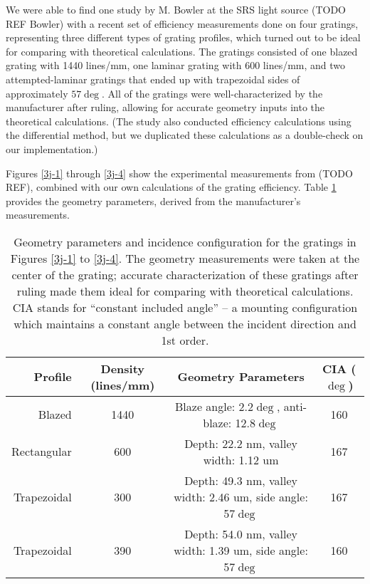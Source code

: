  We were able to find one study by M. Bowler at the SRS light source (TODO REF Bowler) with a recent set of efficiency measurements done on four gratings, representing three different types of grating profiles, which turned out to be ideal for comparing with theoretical calculations.  The gratings consisted of one blazed grating with 1440 lines/mm, one laminar grating with 600 lines/mm, and two attempted-laminar gratings that ended up with trapezoidal sides of approximately $57\deg$.  All of the gratings were well-characterized by the manufacturer after ruling, allowing for accurate geometry inputs into the theoretical calculations.  (The study also conducted efficiency calculations  using the differential method, but we duplicated these calculations as a double-check on our implementation.)

Figures \ref{3j-1} through \ref{3j-4} show the experimental measurements from (TODO REF), combined with our own calculations of the grating efficiency.  Table \ref{3j-table} provides the geometry parameters, derived from the manufacturer's measurements.

\begin{table}[htbp]
   \centering
   \caption{Geometry parameters and incidence configuration for the gratings in Figures \ref{3j-1} to \ref{3j-4}.  The geometry measurements were taken at the center of the grating; accurate characterization of these gratings after ruling made them ideal for comparing with theoretical calculations. CIA stands for ``constant included angle'' -- a mounting configuration which maintains a constant angle between the incident direction and 1st order.}
   \begin{tabular}{@{} |r c c c| @{}} %
      \hline
        Profile    &  Density (lines/mm)& Geometry Parameters & CIA ($\deg$)\\
      \hline \hline
Blazed & 1440 & Blaze angle: 2.2$\deg$, anti-blaze: 12.8$\deg$ & 160 \\
Rectangular & 600 & Depth: 22.2 nm, valley width: 1.12 um & 167 \\
Trapezoidal & 300 & Depth: 49.3 nm, valley width: 2.46 um, side angle: 57$\deg$ & 167\\
Trapezoidal & 390 & Depth: 54.0 nm, valley width: 1.39 um, side angle: 57$\deg$ & 160\\
\hline
   \end{tabular}
   \label{3j-table}
\end{table}

